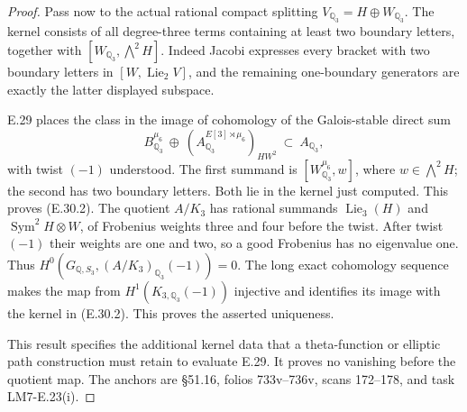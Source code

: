 \begin{proof}
Pass now to the actual rational compact splitting
$V_{\mathbb Q_3}=H\oplus W_{\mathbb Q_3}$.
The kernel consists of all degree-three terms containing at
least two boundary letters, together with
$[W_{\mathbb Q_3},\bigwedge^2H]$.
Indeed Jacobi expresses every bracket with two boundary letters
in $[W,\operatorname{Lie}_2V]$, and the remaining one-boundary
generators are exactly the latter displayed subspace.

E.29 places the class in the image of cohomology of the
Galois-stable direct sum
\[
 B^{\mu_6}_{\mathbb Q_3}
       \ \oplus\
 (A_{\mathbb Q_3}^{E[3]\rtimes\mu_6})_{HW^2}
       \ \subset\ A_{\mathbb Q_3},
\]
with twist $(-1)$ understood. The first summand is
$[W^{\mu_6}_{\mathbb Q_3},w]$, where
$w\in\bigwedge^2H$; the second has two boundary letters.
Both lie in the kernel just computed. This proves (E.30.2).
The quotient $A/K_3$ has rational summands
$\operatorname{Lie}_3(H)$ and
$\operatorname{Sym}^2H\otimes W$, of Frobenius weights
three and four before the twist. After twist $(-1)$ their
weights are one and two, so a good Frobenius has no eigenvalue
one. Thus $H^0(G_{\mathbb Q,S_3},(A/K_3)_{\mathbb Q_3}(-1))=0$.
The long exact cohomology sequence makes the map from
$H^1(K_{3,\mathbb Q_3}(-1))$ injective and identifies its image
with the kernel in (E.30.2). This proves the asserted uniqueness.

This result specifies the additional kernel data that a
theta-function or elliptic path construction must retain to
evaluate E.29. It proves no vanishing before the quotient map.
The anchors are \S51.16, folios 733v--736v, scans 172--178,
and task LM7-E.23(i).
\end{proof}
